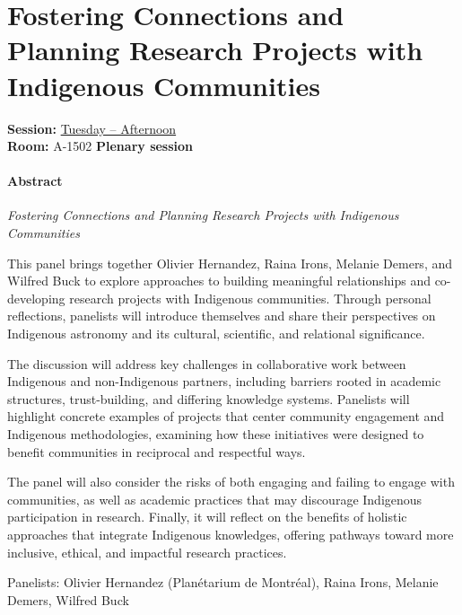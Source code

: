 \setcounter{section}{0}
\hypertarget{invited-indigenous-engagement-panel}{}
\label{invited-page-indigenous-engagement-panel}
\section{Fostering Connections and Planning Research Projects with Indigenous Communities}
\textbf{Session:} \hyperlink{schedule-tuesday-afternoon-a-1502}{Tuesday -- Afternoon}\\
\textbf{Room:} A-1502 \textbf{Plenary session}\\



\paragraph{Abstract}
{\itshape
Fostering Connections and Planning Research Projects with Indigenous Communities


This panel brings together Olivier Hernandez, Raina Irons, Melanie Demers, and Wilfred Buck to explore approaches to building meaningful relationships and co-developing research projects with Indigenous communities. Through personal reflections, panelists will introduce themselves and share their perspectives on Indigenous astronomy and its cultural, scientific, and relational significance.

The discussion will address key challenges in collaborative work between Indigenous and non-Indigenous partners, including barriers rooted in academic structures, trust-building, and differing knowledge systems. Panelists will highlight concrete examples of projects that center community engagement and Indigenous methodologies, examining how these initiatives were designed to benefit communities in reciprocal and respectful ways.

The panel will also consider the risks of both engaging and failing to engage with communities, as well as academic practices that may discourage Indigenous participation in research. Finally, it will reflect on the benefits of holistic approaches that integrate Indigenous knowledges, offering pathways toward more inclusive, ethical, and impactful research practices.

Panelists:
Olivier Hernandez (Planétarium de Montréal), Raina Irons, Melanie Demers,
Wilfred Buck
}

\hypertarget{invited-vincent-henault-brunet}{}
\label{invited-page-vincent-henault-brunet}
